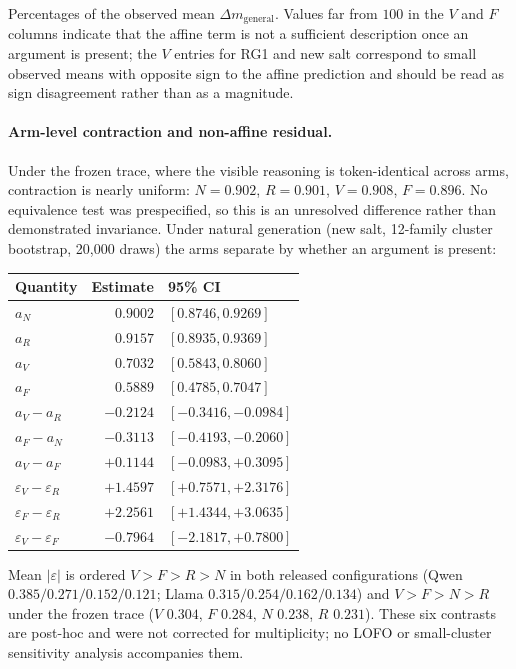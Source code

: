 \documentclass[letterpaper]{article}
\begin{document}
\noindent Percentages of the observed mean $\Delta m_{\mathrm{general}}$. Values far from $100$ in the $V$ and $F$ columns indicate that the affine term is not a sufficient description once an argument is present; the $V$ entries for RG1 and new salt correspond to small observed means with opposite sign to the affine prediction and should be read as sign disagreement rather than as a magnitude.

\paragraph{Arm-level contraction and non-affine residual.}
Under the frozen trace, where the visible reasoning is token-identical across arms, contraction is nearly uniform: $N=0.902$, $R=0.901$, $V=0.908$, $F=0.896$. No equivalence test was prespecified, so this is an unresolved difference rather than demonstrated invariance. Under natural generation (new salt, 12-family cluster bootstrap, 20{,}000 draws) the arms separate by whether an argument is present:
\begin{center}
\small
\begin{tabular}{@{}lrl@{}}
\toprule
Quantity & Estimate & 95\% CI \\
\midrule
$a_{N}$ & $0.9002$ & $[0.8746,0.9269]$ \\
$a_{R}$ & $0.9157$ & $[0.8935,0.9369]$ \\
$a_{V}$ & $0.7032$ & $[0.5843,0.8060]$ \\
$a_{F}$ & $0.5889$ & $[0.4785,0.7047]$ \\
\midrule
$a_{V}-a_{R}$ & $-0.2124$ & $[-0.3416,-0.0984]$ \\
$a_{F}-a_{N}$ & $-0.3113$ & $[-0.4193,-0.2060]$ \\
$a_{V}-a_{F}$ & $+0.1144$ & $[-0.0983,+0.3095]$ \\
$\varepsilon_{V}-\varepsilon_{R}$ & $+1.4597$ & $[+0.7571,+2.3176]$ \\
$\varepsilon_{F}-\varepsilon_{R}$ & $+2.2561$ & $[+1.4344,+3.0635]$ \\
$\varepsilon_{V}-\varepsilon_{F}$ & $-0.7964$ & $[-2.1817,+0.7800]$ \\
\bottomrule
\end{tabular}
\end{center}
\noindent Mean $|\varepsilon|$ is ordered $V>F>R>N$ in both released configurations (Qwen $0.385/0.271/0.152/0.121$; Llama $0.315/0.254/0.162/0.134$) and $V>F>N>R$ under the frozen trace ($V$ $0.304$, $F$ $0.284$, $N$ $0.238$, $R$ $0.231$). These six contrasts are post-hoc and were not corrected for multiplicity; no LOFO or small-cluster sensitivity analysis accompanies them.
\end{document}
